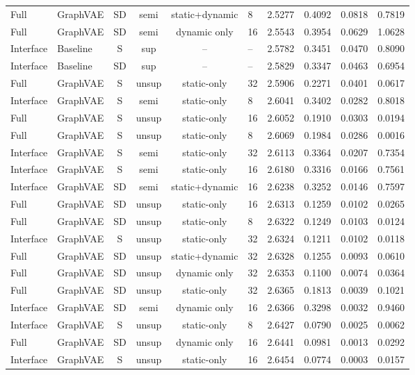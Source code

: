 \begin{landscape}
\begin{longtable}{llccclcccc}
Full & GraphVAE & SD & semi & static+dynamic & 8 & 2.5277 & 0.4092 & 0.0818 & 0.7819 \\
Full & GraphVAE & SD & semi & dynamic only & 16 & 2.5543 & 0.3954 & 0.0629 & 1.0628 \\
Interface & Baseline & S & sup & -- & -- & 2.5782 & 0.3451 & 0.0470 & 0.8090 \\
Interface & Baseline & SD & sup & -- & -- & 2.5829 & 0.3347 & 0.0463 & 0.6954 \\
Full & GraphVAE & S & unsup & static-only & 32 & 2.5906 & 0.2271 & 0.0401 & 0.0617 \\
Interface & GraphVAE & S & semi & static-only & 8 & 2.6041 & 0.3402 & 0.0282 & 0.8018 \\
Full & GraphVAE & S & unsup & static-only & 16 & 2.6052 & 0.1910 & 0.0303 & 0.0194 \\
Full & GraphVAE & S & unsup & static-only & 8 & 2.6069 & 0.1984 & 0.0286 & 0.0016 \\
Interface & GraphVAE & S & semi & static-only & 32 & 2.6113 & 0.3364 & 0.0207 & 0.7354 \\
Interface & GraphVAE & S & semi & static-only & 16 & 2.6180 & 0.3316 & 0.0166 & 0.7561 \\
Interface & GraphVAE & SD & semi & static+dynamic & 16 & 2.6238 & 0.3252 & 0.0146 & 0.7597 \\
Full & GraphVAE & SD & unsup & static-only & 16 & 2.6313 & 0.1259 & 0.0102 & 0.0265 \\
Full & GraphVAE & SD & unsup & static-only & 8 & 2.6322 & 0.1249 & 0.0103 & 0.0124 \\
Interface & GraphVAE & S & unsup & static-only & 32 & 2.6324 & 0.1211 & 0.0102 & 0.0118 \\
Full & GraphVAE & SD & unsup & static+dynamic & 32 & 2.6328 & 0.1255 & 0.0093 & 0.0610 \\
Full & GraphVAE & SD & unsup & dynamic only & 32 & 2.6353 & 0.1100 & 0.0074 & 0.0364 \\
Full & GraphVAE & SD & unsup & static-only & 32 & 2.6365 & 0.1813 & 0.0039 & 0.1021 \\
Interface & GraphVAE & SD & semi & dynamic only & 16 & 2.6366 & 0.3298 & 0.0032 & 0.9460 \\
Interface & GraphVAE & S & unsup & static-only & 8 & 2.6427 & 0.0790 & 0.0025 & 0.0062 \\
Full & GraphVAE & SD & unsup & dynamic only & 16 & 2.6441 & 0.0981 & 0.0013 & 0.0292 \\
Interface & GraphVAE & S & unsup & static-only & 16 & 2.6454 & 0.0774 & 0.0003 & 0.0157 \\

\end{longtable}
\end{landscape}
